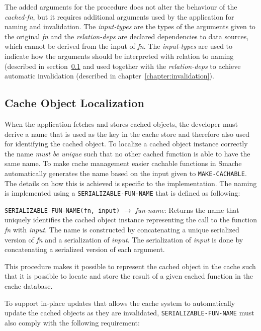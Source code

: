 The added arguments for the procedure does not alter the behaviour of the \emph{cached-fn}, but it requires additional arguments used by the application for naming and invalidation. The \emph{input-types} are the types of the arguments given to the original \emph{fn} and the \emph{relation-deps} are declared dependencies to data sources, which cannot be derived from the input of \emph{fn}. The \emph{input-types} are used to indicate how the arguments should be interpreted with relation to naming (described in section~\ref{subsec:cache-object-localization} and used together with the \emph{relation-deps} to achieve automatic invalidation (described in chapter~\ref{chapter:invalidation}).


\subsection{Cache Object Localization}
\label{subsec:cache-object-localization}

When the application fetches and stores cached objects, the developer must derive a name that is used as the key in the cache store and therefore also used for identifying the cached object. To localize a cached object instance correctly the name \emph{must be unique} such that no other cached function is able to have the same name. To make cache management easier cachable functions in Smache automatically generates the name based on the input given to \verb$MAKE-CACHABLE$. The details on how this is achieved is specific to the implementation. The naming is implemented using a \verb$SERIALIZABLE-FUN-NAME$ that is defined as following:

\verb$SERIALIZABLE-FUN-NAME(fn, input)$ $\rightarrow$ \emph{fun-name}: Returns the name that uniquely identifies the cached object instance representing the call to the function \emph{fn} with \emph{input}. The name is constructed by concatenating a unique serialized version of \emph{fn} and a serialization of \emph{input}. The serialization of \emph{input} is done by concatenating a serialized version of each argument.

This procedure makes it possible to represent the cached object in the cache such that it is possible to locate and store the result of a given cached function in the cache database.

To support in-place updates that allows the cache system to automatically update the cached objects as they are invalidated, \verb$SERIALIZABLE-FUN-NAME$ must also comply with the following requirement:

